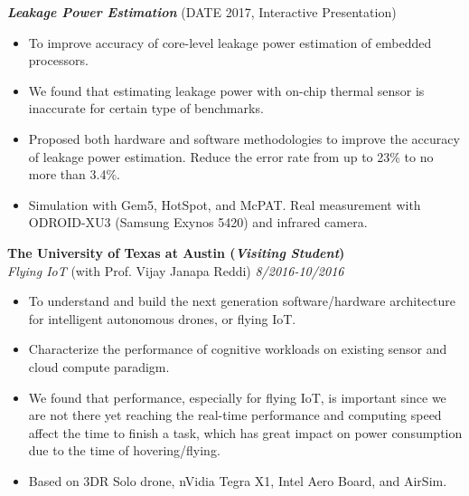 \documentclass[margin, 9pt]{res} %
\begin{document}
\begin{resume}
\medskip

{\large \textbf{\textit{Leakage Power Estimation}} \hfill(DATE 2017, Interactive Presentation)}\\
\vspace*{-10pt}
\begin{itemize}[leftmargin=*] \itemsep -3pt
\vspace*{-5pt}
  \item To improve accuracy of core-level leakage power estimation of embedded
  processors.
  \item We found that estimating leakage power with on-chip thermal sensor is
  inaccurate for certain type of benchmarks.
  \item Proposed both hardware and software methodologies to improve the
  accuracy of leakage power estimation. Reduce the error rate from up to 23\% to
  no more than 3.4\%.
  \item Simulation with Gem5, HotSpot, and McPAT. Real measurement with
  ODROID-XU3 (Samsung Exynos 5420) and infrared camera.
\end{itemize}

\bigskip

{\large\textbf{The University of Texas at Austin (\textit{Visiting Student})}}\\

\vspace*{-7pt}
{\large\textit{Flying IoT} (with Prof. Vijay Janapa Reddi)} \hfill\textit{8/2016-10/2016}\\
\vspace*{-7pt}
\begin{itemize}[leftmargin=*] \itemsep -3pt
\vspace*{-5pt}
  \item To understand and build the next generation software/hardware
  architecture for intelligent autonomous drones, or flying IoT.
  \item Characterize the performance of cognitive workloads on existing sensor
  and cloud compute paradigm.
  \item We found that performance, especially for flying IoT, is important since
  we are not there yet reaching the real-time performance and computing speed
  affect the time to finish a task, which has great impact on power consumption
  due to the time of hovering/flying.
  \item Based on 3DR Solo drone, nVidia Tegra X1, Intel Aero Board, and AirSim.
\end{itemize}


\end{resume}
\end{document}
